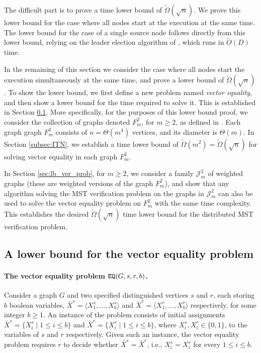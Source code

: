 \documentclass[11pt,letter]{article}
\def\EQ{\mbox{\tt EQ}}
\def\cJ{\mathcal{J}}
\def\INPUTS{\bar{X}^s}
\def\INPUTR{\bar{X}^r}
\begin{document}
The difficult part is to prove a time lower bound of $\tilde{\Omega}(\sqrt{n})$.
We prove this lower bound for the case where all nodes start at the execution 
at the same time. The lower bound for the case of a single source node follows 
directly from this lower bound, relying on the leader election algorithm 
of \cite{KPPRT12}, which runs  in $\tilde{O}(D)$ time.

In the remaining of this section we consider the case where all nodes start the execution simultaneously at the same time, and prove a lower bound of $\tilde{\Omega}(\sqrt{n})$.
To show the lower bound, 
we first define a new problem named {\em vector equality}, and then show 
a lower bound for the time required to solve it. 
This is established in Section \ref{sec:VEprob}.
More specifically, for the purposes of this lower bound proof, we consider the collection of graphs denoted $F^2_m$, for
$m\ge 2$, as defined in \cite{PR_00}. Each graph graph $F^2_m$ consists of
$n = \Theta(m^4)$ vertices, and its diameter is $\Theta(m)$. In Section \ref{subsec:ITN}, we establish a time lower bound 
of $\tilde{\Omega}(m^2)=\tilde{\Omega}(\sqrt{n})$ for solving vector equality in each graph $F^2_m$.

In Section \ref{sec:lb_ver_prob}, for
$m\ge 2$, we consider a family $\cJ^2_m$ of weighted
graphs (these are weighted versions of the graph $F^2_m$), and show that any algorithm solving 
the MST verification problem on the graphs in $\cJ^2_m$ can also be used to 
solve the vector equality problem on $F^2_m$ with the same time complexity.
This establishes the desired $\tilde{\Omega}(\sqrt{n})$ time lower bound for the distributed MST verification problem.


\subsection{A lower bound for the vector equality problem}
\label{sec:VEprob}

\paragraph{The vector equality problem $\EQ(G,s,r,b)$.}
Consider a graph $G$ and two specified distinguished vertices $s$ and $r$, 
each storing $b$ boolean variables, 
$\bar{X}^s=\langle X_1^{s}, \dots, X_b^{s} \rangle $ and
$\bar{X}^r=\langle X_1^{r}, \dots,X_b^{r} \rangle $ respectively,
for some integer $b \ge 1$. An instance of the problem 
consists of initial assignments
$\INPUTS  = \{X_i^{s} \mid 1 \le i \le b\}$ and 
$\INPUTR = \{X_i^{r} \mid 1 \le i \le b\}$, 
where $X_i^{s},X_i^{r} \in \{0,1\}$,
to the variables of $s$ and $r$ respectively. Given such
an instance, the vector equality problem requires $r$ to decide whether 
$\bar{X}^s=\bar{X}^r$,  i.e., $X_i^s=X_i^r$ for every $1\le i\le b$.  
\end{document}
